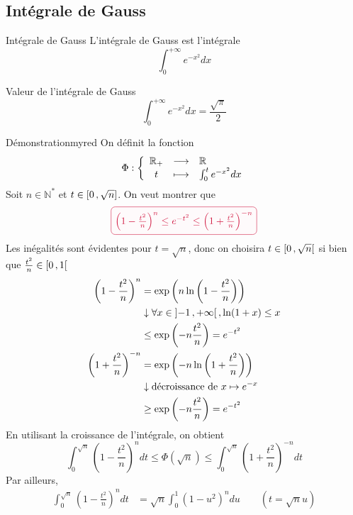     \subsection{Intégrale de Gauss}

    \begin{defi}{Intégrale de Gauss}{}
        L’intégrale de Gauss est l’intégrale \[\int_{0}^{+ \infty} e^{-x^2} dx \]
    \end{defi}

    \begin{theo}{Valeur de l’intégrale de Gauss}{}
        \[ \int_{0}^{+ \infty} e^{-x^2} dx = \frac{\sqrt{\pi}}{2} \]
    \end{theo}

    \begin{demo}{Démonstration}{myred}
        On définit la fonction \[ \fonction{\Phi}{\mathbb{R}_+}{\mathbb{R}}{t}{\int_{0}^{t} e^{-x^2}dx} \]
        Soit $n \in \mathbb{N}^*$ et $t \in \left[ 0 \, , \sqrt{n} \right]$. On veut montrer que \[ \lilbox{myred}{$\left(1 - \frac{t^2}{n}\right)^n \leq e^{-t^2} \leq \left(1 + \frac{t^2}{n}\right)^{-n}$} \] 
        Les inégalités sont évidentes pour $t = \sqrt{n}$, donc on choisira $t \in \left[ 0 \, , \sqrt{n} \right[$ si bien que $ \frac{t^2}{n} \in \left[ 0 \, , 1 \right[$
        \begin{align*}
            \left(1 - \frac{t^2}{n}\right)^n &= \exp\left(n \ln \left(1 - \frac{t^2}{n}\right)\right) \\
            & \downarrow \forall x \in \left] -1 \, , +\infty \right[, \ln(1+x) \leq x \\
            & \leq \exp \left(-n \frac{t^2}{n}\right) = e^{-t^2} \\
            \left(1 + \frac{t^2}{n}\right)^{-n} &= \exp\left(-n \ln\left(1 + \frac{t^2}{n}\right)\right) \\
            & \downarrow \text{décroissance de } x \mapsto e^{-x} \\
            & \geq \exp\left(-n \frac{t^2}{n}\right) = e^{-t^2}
        \end{align*}
        En utilisant la croissance de l’intégrale, on obtient 
        \[ \int_{0}^{\sqrt{n}} \left(1 - \frac{t^2}{n}\right)^n dt \leq \Phi(\sqrt{n}) \leq \int_{0}^{\sqrt{n}} \left(1 + \frac{t^2}{n}\right)^{-n} dt \]
        Par ailleurs,
        \begin{align*}
            \int_{0}^{\sqrt{n}} \left(1 - \frac{t^2}{n}\right)^n dt &= \sqrt{n} \int_{0}^{1} (1-u^2)^n du \qquad (t = \sqrt{n} u) \\

\end{align*}
\end{demo}
